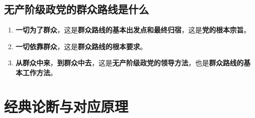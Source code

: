 \documentclass[12pt, a4paper, oneside]{ctexbook}
\begin{document}
\subsection{无产阶级政党的群众路线是什么}

\begin{enumerate}
\item \textbf{一切为了群众}，这是\textbf{群众路线的基本出发点和最终归宿}，这是\textbf{党的根本宗旨}。
\item \textbf{一切依靠群众}，这是\textbf{群众路线的根本要求}。
\item \textbf{从群众中来}，\textbf{到群众中去}，这是\textbf{无产阶级政党的领导方法}，也是\textbf{群众路线的基本工作方法}。
\end{enumerate}

\section{经典论断与对应原理}
\end{document}
